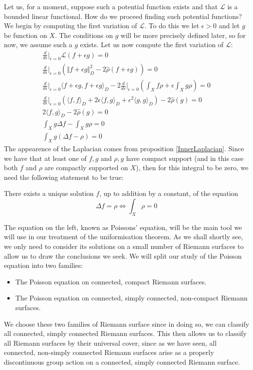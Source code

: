 \documentclass[11pt]{report}
\theoremstyle{definition}
\begin{document}
Let us, for a moment, suppose such a potential function exists and that $\mathcal{L}$ is a bounded linear functional. How do we proceed finding such potential functions?
We begin by computing the first variation of $\mathcal{L}$. To do this we let $\epsilon > 0$ and let $g$ be function on $X$. The conditions on $g$ will be more precisely defined later, so for now, we assume such a $g$ exists. Let us now compute the first variation of $\mathcal{L}$:
\begin{gather*}
  \frac{d}{d\epsilon}\biggr\rvert_{\epsilon = 0}\mathcal{L}(f+\epsilon g) = 0 \\
  \frac{d}{d\epsilon}\biggr\rvert_{\epsilon = 0}(\Vert f+\epsilon g\Vert _D^2 -2\hat{\rho}(f+\epsilon g)) = 0 \\
  \frac{d}{d\epsilon}\biggr\rvert_{\epsilon = 0} \langle f + \epsilon g, f + \epsilon g \rangle_D -2\frac{d}{d\epsilon}\biggr\rvert_{\epsilon = 0}(\int_X f\rho  + \epsilon \int_X g\rho) = 0 \\
  \frac{d}{d\epsilon}\biggr\rvert_{\epsilon = 0}(\langle f, f \rangle_D + 2\epsilon \langle f, g \rangle_D +\epsilon^2 \langle g, g \rangle_D) -2 \hat{\rho}(g) = 0 \\
  2\langle f, g \rangle_D -2\hat{\rho}(g) = 0 \\
  \int_X g\Delta f - \int_X g\rho = 0 \\
  \int_X g(\Delta f - \rho) = 0 
\end{gather*}
The appearence of the Laplacian comes from proposition \ref{InnerLaplacian}.
Since we have that at least one of $f,g$ and $\rho,g$ have compact support (and in this case both $f$ and $\rho$ are compactly supported on $X$), then for this integral to be zero, we need the following statement to be true:

There exists a unique solution $f$, up to addition by a constant, of the equation 
\[ \Delta f = \rho \Longleftrightarrow \int_X \rho = 0\]

The equation on the left, known as Poissons' equation, will be the main tool we will use in our treatment of the uniformisation theorem. As we shall shortly see, we only need to consider its solutions on a small number of Riemann surfaces to allow us to draw the conclusions we seek. We will split our study of the Poisson equation into two families:
\begin{itemize}
  \item The Poisson equation on connected, compact Riemann surfaces.
  \item The Poisson equation on connected, simply connected, non-compact Riemann surfaces.
\end{itemize}
We choose these two families of Riemann surface since in doing so, we can classify all connected, simply connected Riemann surfaces. This then allows us to classify all Riemann surfaces by their universal cover, since as we have seen, all connected, non-simply connected Riemann surfaces arise as a properly discontinuous group action on a connected, simply connected Riemann surface.
\end{document}
